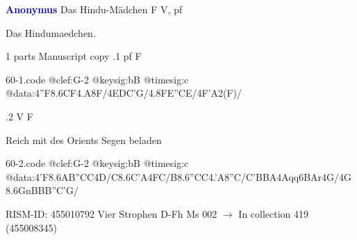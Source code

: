 \documentclass[twocolumn]{book}
\begin{document}
\newline \par \vspace{7pt} \textcolor{darkblue}{\textbf{Anonymus  }}
\newline Das Hindu-Mädchen  F  
\newline V, pf
\newline \begin{itshape}[heading, f.63r:] Das Hindumaedchen.\end{itshape} 
\newline \textcolor{darkblue}{}  1 parts  
\newline Manuscript copy
.1  pf  F  
\begin{filecontents*}{60-1.code}
@clef:G-2
@keysig:bB
@timesig:c
@data:4''F{8.6CF}4.A8F/4EDC'G/4.8FE''CE/4F'A2(F)/
\end{filecontents*}
\newline
%

.2  V  F
\newline \begin{footnotesize} Reich mit des Orients Segen beladen \end{footnotesize}  
\begin{filecontents*}{60-2.code}
@clef:G-2
@keysig:bB
@timesig:c
@data:4'F{8.6AB}{''CC}4D/C{8.6C'A}4FC/B{8.6''CC}4.'A8''C/C'BBA4Aqq6BAr4G/4G8.6GnB{BB}''C'G/
\end{filecontents*}
\newline
%

\newline RISM-ID: 455010792
\newline Vier Strophen
\newline D-Fh  Ms 002
\newline $\rightarrow$ In collection 419 (455008345)
\end{document}

